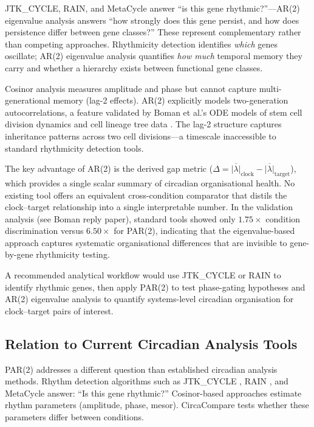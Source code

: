 \documentclass[11pt,a4paper]{article}
\begin{document}
JTK\_CYCLE, RAIN, and MetaCycle answer ``is this gene rhythmic?''---AR(2) eigenvalue analysis answers ``how strongly does this gene persist, and how does persistence differ between gene classes?'' These represent complementary rather than competing approaches. Rhythmicity detection identifies \textit{which} genes oscillate; AR(2) eigenvalue analysis quantifies \textit{how much} temporal memory they carry and whether a hierarchy exists between functional gene classes.

Cosinor analysis measures amplitude and phase but cannot capture multi-generational memory (lag-2 effects). AR(2) explicitly models two-generation autocorrelations, a feature validated by Boman et al.'s ODE models of stem cell division dynamics and cell lineage tree data \citep{boman2020fibonacci}. The lag-2 structure captures inheritance patterns across two cell divisions---a timescale inaccessible to standard rhythmicity detection tools.

The key advantage of AR(2) is the derived gap metric ($\Delta = \overline{|\lambda|}_{\text{clock}} - \overline{|\lambda|}_{\text{target}}$), which provides a single scalar summary of circadian organisational health. No existing tool offers an equivalent cross-condition comparator that distils the clock--target relationship into a single interpretable number. In the validation analysis (see Boman reply paper), standard tools showed only $1.75\times$ condition discrimination versus $6.50\times$ for PAR(2), indicating that the eigenvalue-based approach captures systematic organisational differences that are invisible to gene-by-gene rhythmicity testing.

A recommended analytical workflow would use JTK\_CYCLE or RAIN to identify rhythmic genes, then apply PAR(2) to test phase-gating hypotheses and AR(2) eigenvalue analysis to quantify systems-level circadian organisation for clock--target pairs of interest.

\subsection{Relation to Current Circadian Analysis Tools}

PAR(2) addresses a different question than established circadian analysis methods. Rhythm detection algorithms such as JTK\_CYCLE \citep{hughes2010jtk}, RAIN \citep{thaben2014rain}, and MetaCycle \citep{wu2016metacycle} answer: ``Is this gene rhythmic?'' Cosinor-based approaches estimate rhythm parameters (amplitude, phase, mesor). CircaCompare tests whether these parameters differ between conditions.
\end{document}
